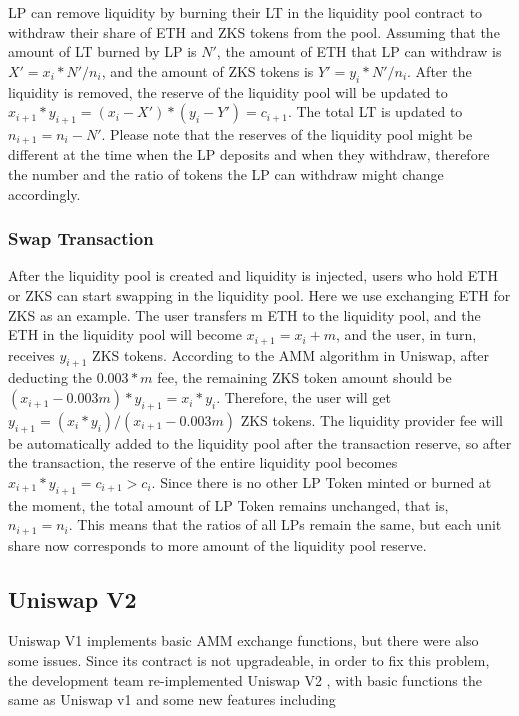 \documentclass[]{template/llncs}
\begin{document}
LP can remove liquidity by burning their LT in the liquidity pool contract to withdraw their share of ETH and ZKS tokens from the pool. Assuming that the amount of LT burned by LP is $N'$, the amount of ETH that LP can withdraw is $X'= x_i*N'/n_i$, and the amount of ZKS tokens is $Y'= y_i*N'/n_i$. After the liquidity is removed, the reserve of the liquidity pool will be updated to $x_{i+1}*y_{i+1} = (x_i-X')*(y_i-Y') = c_{i+1}$. The total LT is updated to $n_{i+1} = n_i-N'$. Please note that the reserves of the liquidity pool might be different at the time when the LP deposits and when they withdraw, therefore the number and the ratio of tokens the LP can withdraw might change accordingly.  


\subsubsection{Swap Transaction}

After the liquidity pool is created and liquidity is injected, users who hold ETH or ZKS can start swapping in the liquidity pool. Here we use exchanging ETH for ZKS as an example. The user transfers m ETH to the liquidity pool, and the ETH in the liquidity pool will become $x_{i+1} = x_i + m$, and the user, in turn, receives $y_{i+1}$ ZKS tokens. According to the AMM algorithm in Uniswap, after deducting the $0.003*m$ fee, the remaining ZKS token amount should be $(x_{i+1} - 0.003m)*y_{i+1} = x_i*y_i$. Therefore, the user will get $y_{i+1} = (x_i*y_i)/(x_{i+1} - 0.003m)$ ZKS tokens. The liquidity provider fee will be automatically added to the liquidity pool after the transaction reserve, so after the transaction, the reserve of the entire liquidity pool becomes $x_{i+1}*y_{i+1} = c_{i+1}> c_i$. Since there is no other LP Token minted or burned at the moment, the total amount of LP Token remains unchanged, that is, $n_{i+1} = n_i$. This means that the ratios of all LPs remain the same, but each unit share now corresponds to more amount of the liquidity pool reserve.



\subsection{Uniswap V2}
Uniswap V1 implements basic AMM exchange functions, but there were also some issues. Since its contract is not upgradeable, in order to fix this problem, the development team re-implemented Uniswap V2 \cite{uniswapv2}, with basic functions the same as Uniswap v1 and some new features including
\end{document}
